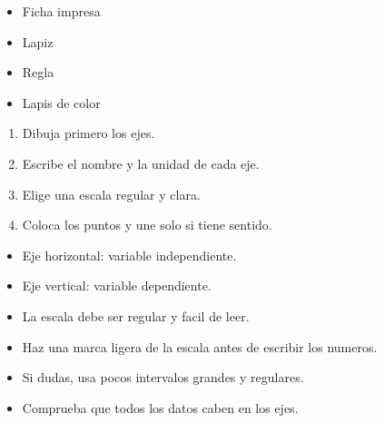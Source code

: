 \documentclass[12pt,a4paper]{article}
\begin{document}
        \FichaCabecera

        \begin{materialesbox}
        \begin{itemize}
    \item Ficha impresa
    \item Lapiz
    \item Regla
    \item Lapis de color
\end{itemize}
        \end{materialesbox}

        \begin{pasosbox}
        \begin{enumerate}
    \item Dibuja primero los ejes.
    \item Escribe el nombre y la unidad de cada eje.
    \item Elige una escala regular y clara.
    \item Coloca los puntos y une solo si tiene sentido.
\end{enumerate}
        \end{pasosbox}

        \begin{recordatoriobox}
        \begin{itemize}
    \item Eje horizontal: variable independiente.
    \item Eje vertical: variable dependiente.
    \item La escala debe ser regular y facil de leer.
\end{itemize}
        \end{recordatoriobox}

        \begin{apoyobox}
        \begin{itemize}
    \item Haz una marca ligera de la escala antes de escribir los numeros.
    \item Si dudas, usa pocos intervalos grandes y regulares.
    \item Comprueba que todos los datos caben en los ejes.
\end{itemize}
        \end{apoyobox}


\end{document}
